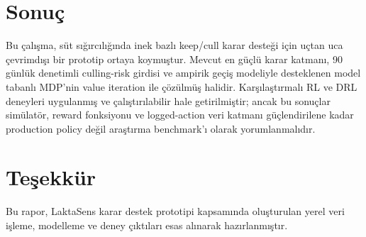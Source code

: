 \documentclass[conference]{IEEEtran}
\begin{document}
\section{Sonuç}
Bu çalışma, süt sığırcılığında inek bazlı keep/cull karar desteği için uçtan
uca çevrimdışı bir prototip ortaya koymuştur. Mevcut en güçlü karar katmanı,
90 günlük denetimli culling-risk girdisi ve ampirik geçiş modeliyle desteklenen
model tabanlı MDP'nin value iteration ile çözülmüş halidir. Karşılaştırmalı RL
ve DRL deneyleri uygulanmış ve çalıştırılabilir hale getirilmiştir; ancak bu
sonuçlar simülatör, reward fonksiyonu ve logged-action veri katmanı
güçlendirilene kadar production policy değil araştırma benchmark'ı olarak
yorumlanmalıdır.

\section*{Teşekkür}
Bu rapor, LaktaSens karar destek prototipi kapsamında oluşturulan yerel
veri işleme, modelleme ve deney çıktıları esas alınarak hazırlanmıştır.
\end{document}
